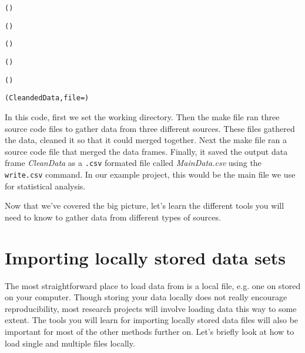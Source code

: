\begin{knitrout}
\color{fgcolor}\begin{kframe}
\begin{alltt}
\hlcomment{################}
\hlcomment{################}

()

()

()

()
    
()

(CleandedData, file = )
\end{alltt}
\end{kframe}
\end{knitrout}


In this code, first we set the working directory. Then the make file ran three source code files to gather data from three different sources. These files gathered the data, cleaned it so that it could merged together. Next the make file ran a source code file that merged the data frames. Finally, it saved the output data frame {\emph{CleanData}} as a \texttt{.csv} formated file called {\emph{MainData.csv}} using the {\tt{write.csv}} command. In our example project, this would be the main file we use for statistical analysis. 

Now that we've covered the big picture, let's learn the different tools you will need to know to gather data from different types of sources.

\section{Importing locally stored data sets}

The most straightforward place to load data from is a local file, e.g. one on stored on your computer. Though storing your data locally does not really encourage reproducibility, most research projects will involve loading data this way to some extent. The tools you will learn for importing locally stored data files will also be important for most of the other methods further on. Let's briefly look at how to load single and multiple files locally.

